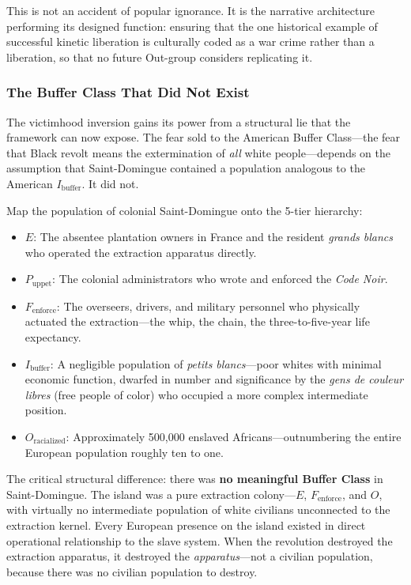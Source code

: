 \documentclass[12pt,openany]{book}
\begin{document}
This is not an accident of popular ignorance. It is the narrative architecture performing its designed function: ensuring that the one historical example of successful kinetic liberation is culturally coded as a war crime rather than a liberation, so that no future Out-group considers replicating it.

\subsubsection*{The Buffer Class That Did Not Exist}

The victimhood inversion gains its power from a structural lie that the framework can now expose. The fear sold to the American Buffer Class---the fear that Black revolt means the extermination of \textit{all} white people---depends on the assumption that Saint-Domingue contained a population analogous to the American $I_{\text{buffer}}$. It did not.

Map the population of colonial Saint-Domingue onto the 5-tier hierarchy:
\begin{itemize}
    \item \textbf{$E$}: The absentee plantation owners in France and the resident \textit{grands blancs} who operated the extraction apparatus directly.
    \item \textbf{$P_{\text{uppet}}$}: The colonial administrators who wrote and enforced the \textit{Code Noir}.
    \item \textbf{$F_{\text{enforce}}$}: The overseers, drivers, and military personnel who physically actuated the extraction---the whip, the chain, the three-to-five-year life expectancy.
    \item \textbf{$I_{\text{buffer}}$}: A negligible population of \textit{petits blancs}---poor whites with minimal economic function, dwarfed in number and significance by the \textit{gens de couleur libres} (free people of color) who occupied a more complex intermediate position.
    \item \textbf{$O_{\text{racialized}}$}: Approximately 500,000 enslaved Africans---outnumbering the entire European population roughly ten to one.
\end{itemize}

The critical structural difference: there was \textbf{no meaningful Buffer Class} in Saint-Domingue. The island was a pure extraction colony---$E$, $F_{\text{enforce}}$, and $O$, with virtually no intermediate population of white civilians unconnected to the extraction kernel. Every European presence on the island existed in direct operational relationship to the slave system. When the revolution destroyed the extraction apparatus, it destroyed the \textit{apparatus}---not a civilian population, because there was no civilian population to destroy.
\end{document}
